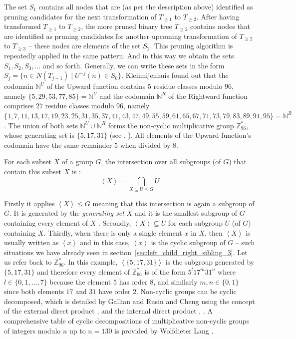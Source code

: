 The set $S_1$ contains all nodes that are (as per the description above) identified as pruning candidates for the next transformation of $T_{\ge1}$ to $T_{\ge2}$. After having transformed $T_{\ge1}$ to $T_{\ge2}$, the more pruned binary tree $T_{\ge2}$ contains nodes that are identified as pruning candidates for another upcoming transformation of $T_{\ge2}$ to $T_{\ge3}$ -- these nodes are elements of the set $S_2$. This pruning algorithm is repeatedly applied in the same pattern. And in this way we obtain the sets $S_1,S_2,S_3,\ldots$ and so forth. Generally, we can write these sets in the form $S_j=\{n\in N(T_{j-1})\mid U^{-j}(n)\in S_0\}$. Kleinnijenhuis found out that the codomain $\mathbb{N}^U$ of the Upward function contains $5$ residue classes modulo $96$, namely $\{5, 29, 53, 77, 85\}=\mathbb{N}^U$ and the codomain $\mathbb{N}^R$ of the Rightward function comprises $27$ residue classes modulo $96$, namely $\{1, 7, 11, 13, 17, 19, 23, 25, 31, 35, 37, 41, 43, 47, 49, 55, 59, 61, 65, 67, 71, 73, 79, 83, 89, 91, 95\}=\mathbb{N}^R$. The union of both sets $\mathbb{N}^U\cup\mathbb{N}^R$ forms the non-cyclic multiplicative group $\mathbb{Z}^\ast_{96}$, whose generating set is $\{5, 17, 31\}$ (see \cite{Ref_Lang_2017}, \cite{Ref_OESIS_A033949}). All elements of the Upward function's codomain have the same remainder $5$ when divided by $8$.

For each subset $X$ of a group $G$, the intersection over all subgroups (of $G$) that contain this subset $X$ is \cite[p.~34]{Ref_Karpfinger_Meyberg_2017}:
\[
\left<X\right>=\bigcap_{X\subseteq U\le G}U
\]

Firstly it applies $\left<X\right>\le G$ meaning that this intersection is again a subgroup of $G$. It is generated by the \textit{generating set} $X$ and it is the smallest subgroup of $G$ containing every element of $X$ \cite[p.~35]{Ref_Karpfinger_Meyberg_2017}. Secondly, $\left<X\right>\subseteq U$ for each subgroup $U$ (of $G$) containing $X$.  Thirdly, when there is only a single element $x$ in $X$, then $\left<X\right>$ is usually written as $\left<x\right>$ and in this case, $\left<x\right>$ is the cyclic subgroup of $G$ -- such situations we have already seen in section~\ref{sec:left_child_right_sibling_3}. Let us refer back to $\mathbb{Z}^\ast_{96}$. In this example, $\left<\{5,17,31\}\right>$ is the subgroup generated by $\{5,17,31\}$ and therefore every element of $\mathbb{Z}^\ast_{96}$ is of the form $5^l17^m31^n$ where $l\in\{0,1,\ldots,7\}$ because the element $5$ has order $8$, and similarly $m,n\in\{0,1\}$ since both elements $17$ and $31$ have order $2$. Non-cyclic groups can be cyclic decomposed, which is detailed by Gallian and Rusin \cite{Ref_Gallian_Rusin_1980} and Cheng \cite{Ref_Cheng_1989} using the concept of the external direct product \cite[p.~79]{Ref_Karpfinger_Meyberg_2017}, \cite[p.~156]{Ref_Gallian} and the internal direct product \cite[p.~80]{Ref_Karpfinger_Meyberg_2017}, \cite[p.~183]{Ref_Gallian}. A comprehensive table of cyclic decompositions of multiplicative non-cyclic groups of integers modulo $n$ up to $n=130$ is provided by Wolfdieter Lang \cite{Ref_Lang_2017}.

